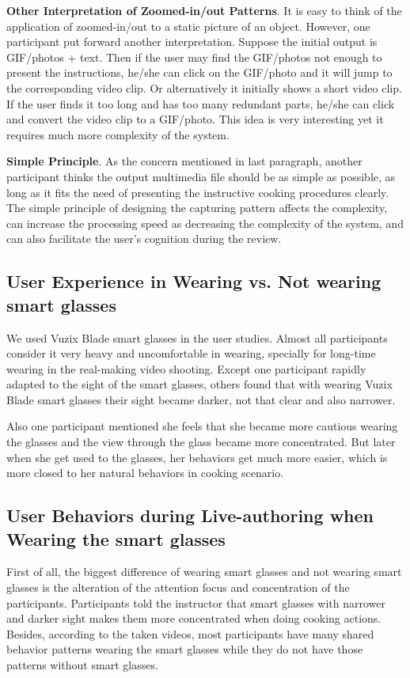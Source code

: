 \documentclass[fyp]{socreport}
\begin{document}
\textbf{Other Interpretation of Zoomed-in/out Patterns}. It is easy to think of the application of zoomed-in/out to a static picture of an object. However, one participant put forward another interpretation. Suppose the initial output is GIF/photos + text. Then if the user may find the GIF/photos not enough to present the instructions, he/she can click on the GIF/photo and it will jump to the corresponding video clip. Or alternatively it initially shows a short video clip. If the user finds it too long and has too many redundant parts, he/she can click and convert the video clip to a GIF/photo. This idea is very interesting yet it requires much more complexity of the system.

\textbf{Simple Principle}. As the concern mentioned in last paragraph, another participant thinks the output multimedia file should be as simple as possible, as long as it fits the need of presenting the instructive cooking procedures clearly. The simple principle of designing the capturing pattern affects the complexity, can increase the processing speed as decreasing the complexity of the system, and can also facilitate the user's cognition during the review.

\subsection{User Experience in Wearing vs. Not wearing smart glasses}
We used Vuzix Blade smart glasses in the user studies. Almost all participants consider it very heavy and uncomfortable in wearing, specially for long-time wearing in the real-making video shooting. Except one participant rapidly adapted to the sight of the smart glasses, others found that with wearing Vuzix Blade smart glasses their sight became darker, not that clear and also narrower.

Also one participant mentioned she feels that she became more cautious wearing the glasses and the view through the glass became more concentrated. But later when she get used to the glasses, her behaviors get much more easier, which is more closed to her natural behaviors in cooking scenario.

\subsection{User Behaviors during Live-authoring when Wearing the smart glasses}
First of all, the biggest difference of wearing smart glasses and not wearing smart glasses is the alteration of the attention focus and concentration of the participants. Participants told the instructor that smart glasses with narrower and darker sight makes them more concentrated when doing cooking actions. Besides, according to the taken videos, most participants have many shared behavior patterns wearing the smart glasses while they do not have those patterns without smart glasses. 
\end{document}
